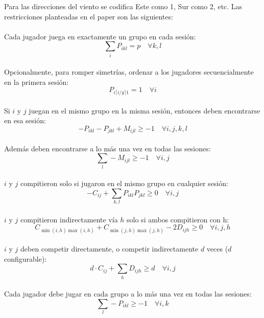 \documentclass[letter, 10pt]{article}
\begin{document}
Para las direcciones del viento se codifica Este como 1, Sur como 2, etc. Las restricciones planteadas en el paper son las siguientes:\\\\
Cada jugador juega en exactamente un grupo en cada sesión:
\begin{equation}
    \sum_{i} P_{ikl} = p \quad \forall k,l
    \label{eq:9}
\end{equation}
\\
Opcionalmente, para romper simetrías, ordenar a los jugadores secuencialmente en la primera sesión:
\begin{equation}
    P_{i\lceil i/g \rceil 1} = 1 \quad \forall i
    \label{eq:10}
\end{equation}
\\
Si $i$ y $j$ juegan en el mismo grupo en la misma sesión, entonces deben encontrarse en esa sesión:
\begin{equation}
    -P_{ikl} -P_{jkl} + M_{ijl} \geq -1 \quad \forall i,j,k,l
    \label{eq:11}
\end{equation}
\\
Además deben encontrarse a lo más una vez en todas las sesiones:
\begin{equation}
    \sum_l -M_{ijl} \geq -1 \quad \forall i,j
    \label{eq:12}
\end{equation}
\\
$i$ y $j$ compitieron solo si jugaron en el mismo grupo en cualquier sesión:
\begin{equation}
    -C_{ij} + \sum_{k,l} P_{ikl}P_{jkl} \geq 0 \quad \forall i,j
    \label{eq:13}
\end{equation}
\\
$i$ y $j$ compitieron indirectamente vía $h$ solo si ambos compitieron con h:
\begin{equation}
    C_{\min(i,h)\max(i,h)} + C_{\min(j,h)\max(j,h)} - 2D_{ijh} \geq 0 \quad \forall i,j,h
    \label{eq:14}
\end{equation}
\\
$i$ y $j$ deben competir directamente, o competir indirectamente $d$ veces ($d$ configurable):
\begin{equation}
    d\cdot C_{ij} + \sum_h D_{ijh} \geq d \quad \forall i,j
    \label{eq:15}
\end{equation}
\\
Cada jugador debe jugar en cada grupo a lo más una vez en todas las sesiones:
\begin{equation}
    \sum_l -P_{ikl} \geq -1 \quad \forall i,k
    \label{eq:16}
\end{equation}
\end{document}
